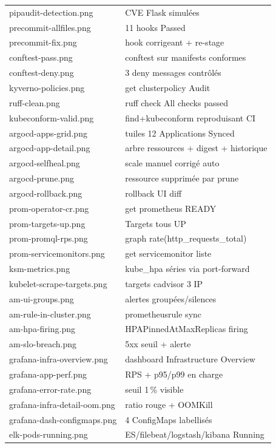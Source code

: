 \documentclass[12pt,a4paper,twoside,openright]{report}
\begin{document}
{\begin{longtable}{@{}p{5.6cm}p{9.4cm}@{}}
pipaudit-detection.png & CVE Flask simulées \\
precommit-allfiles.png & 11 hooks Passed \\
precommit-fix.png & hook corrigeant + re-stage \\
conftest-pass.png & conftest sur manifests conformes \\
conftest-deny.png & 3 deny messages contrôlés \\
kyverno-policies.png & get clusterpolicy Audit \\
ruff-clean.png & ruff check All checks passed \\
kubeconform-valid.png & find+kubeconform reproduisant CI \\
argocd-apps-grid.png & tuiles 12 Applications Synced \\
argocd-app-detail.png & arbre ressources + digest + historique \\
argocd-selfheal.png & scale manuel corrigé auto \\
argocd-prune.png & ressource supprimée par prune \\
argocd-rollback.png & rollback UI diff \\
prom-operator-cr.png & get prometheus READY \\
prom-targets-up.png & Targets tous UP \\
prom-promql-rps.png & graph rate(http\_requests\_total) \\
prom-servicemonitors.png & get servicemonitor liste \\
ksm-metrics.png & kube\_hpa séries via port-forward \\
kubelet-scrape-targets.png & targets cadvisor 3 IP \\
am-ui-groups.png & alertes groupées/silences \\
am-rule-in-cluster.png & prometheusrule sync \\
am-hpa-firing.png & HPAPinnedAtMaxReplicas firing \\
am-slo-breach.png & 5xx seuil + alerte \\
grafana-infra-overview.png & dashboard Infrastructure Overview \\
grafana-app-perf.png & RPS + p95/p99 en charge \\
grafana-error-rate.png & seuil 1\,\% visible \\
grafana-infra-detail-oom.png & ratio rouge + OOMKill \\
grafana-dash-configmaps.png & 4 ConfigMaps labellisés \\
elk-pods-running.png & ES/filebeat/logstash/kibana Running \\

\end{longtable}}
\end{document}
